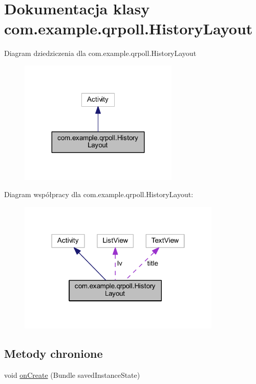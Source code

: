 \hypertarget{classcom_1_1example_1_1qrpoll_1_1_history_layout}{\section{Dokumentacja klasy com.\+example.\+qrpoll.\+History\+Layout}
\label{classcom_1_1example_1_1qrpoll_1_1_history_layout}
}


Diagram dziedziczenia dla com.\+example.\+qrpoll.\+History\+Layout\nopagebreak
\begin{figure}[H]
\begin{center}
\leavevmode
\includegraphics[width=215pt]{classcom_1_1example_1_1qrpoll_1_1_history_layout__inherit__graph}
\end{center}
\end{figure}


Diagram współpracy dla com.\+example.\+qrpoll.\+History\+Layout\+:\nopagebreak
\begin{figure}[H]
\begin{center}
\leavevmode
\includegraphics[width=274pt]{classcom_1_1example_1_1qrpoll_1_1_history_layout__coll__graph}
\end{center}
\end{figure}
\subsection*{Metody chronione}
\begin{DoxyCompactItemize}
\item 
void \hyperlink{classcom_1_1example_1_1qrpoll_1_1_history_layout_a693cf48cd1e688ab4bacfd5ce04f26c4}{on\+Create} (Bundle saved\+Instance\+State)
\end{DoxyCompactItemize}

